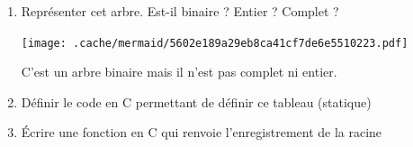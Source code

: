 \begin{enumerate}
\def\labelenumi{\arabic{enumi}.}
\item
  Représenter cet arbre. Est-il binaire ? Entier ? Complet ?

  \texttt{[image: .cache/mermaid/5602e189a29eb8ca41cf7de6e5510223.pdf]}

  C'est un arbre binaire mais il n'est pas complet ni entier.
\item
  Définir le code en C permettant de définir ce tableau (statique)

\begin{Shaded}
\begin{Highlighting}[]
     \OperatorTok{\{}
        \OperatorTok{;}
        \OperatorTok{;}
        \OperatorTok{;}
    \OperatorTok{\};}

\OperatorTok{[}\OperatorTok{];} 
\end{Highlighting}
\end{Shaded}
\item
  Écrire une fonction en C qui renvoie l'enregistrement de la racine

\begin{Shaded}
\begin{Highlighting}[]
    \OperatorTok{(}\OperatorTok{*}\OperatorTok{,} \OperatorTok{,}\OperatorTok{*}\OperatorTok{)} \OperatorTok{\{}
        \OperatorTok{(}\OperatorTok{=} \OperatorTok{;}\OperatorTok{\textless{}}\OperatorTok{;}\OperatorTok{++)} \OperatorTok{\{}
            \OperatorTok{(}\OperatorTok{=} \OperatorTok{;}\OperatorTok{\textless{}}\OperatorTok{;}\OperatorTok{++)} \OperatorTok{\{}
                \OperatorTok{(}\OperatorTok{[}\OperatorTok{].}\OperatorTok{==}\OperatorTok{||}\OperatorTok{[}\OperatorTok{].}\OperatorTok{==}\OperatorTok{)} \OperatorTok{\{}
                    \OperatorTok{;} 
                \OperatorTok{\}}
            \OperatorTok{\}}


\end{Highlighting}
\end{Shaded}
\end{enumerate}
